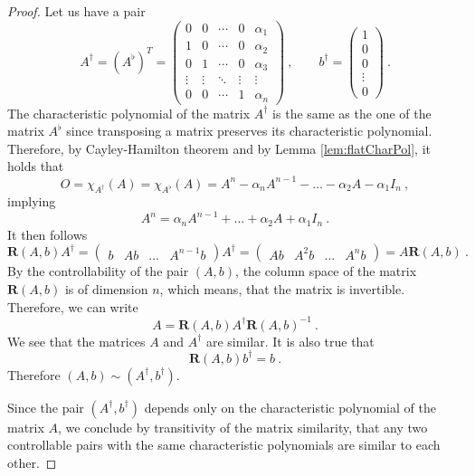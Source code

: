 \begin{proof}
    Let us have a pair
    $$A^\dagger=(A^\flat)^T=
    \begin{pmatrix}
        0 & 0 & \cdots & 0 & \alpha_1 \\
        1 & 0 & \cdots & 0 & \alpha_2 \\
        0 & 1 & \cdots & 0 & \alpha_3 \\
        \vdots & \vdots & \ddots & \vdots & \vdots \\
        0 & 0 & \cdots & 1 & \alpha_n
    \end{pmatrix}\ ,\qquad
    b^\dagger=
    \begin{pmatrix}
        1 \\ 0 \\ 0 \\ \vdots \\ 0
    \end{pmatrix}\ .$$
    The characteristic polynomial of the matrix $A^\dagger$ is the same as the one of the matrix $A^\flat$ since transposing a matrix preserves its characteristic polynomial. Therefore, by Cayley-Hamilton theorem and by Lemma \ref{lem:flatCharPol}, it holds that
    $$O=\chi_{A^\dagger}(A)=\chi_{A^\flat}(A)=A^n-\alpha_nA^{n-1}-\ldots-\alpha_2A-\alpha_1I_n\ ,$$
    implying
    $$A^n=\alpha_nA^{n-1}+\ldots+\alpha_2A+\alpha_1I_n\ .$$
    It then follows 
    $$\mathbf{R}(A,b)A^\dagger=
        \begin{pmatrix} 
            b & Ab & \ldots & A^{n-1}b
        \end{pmatrix}
    A^\dagger=
        \begin{pmatrix}
            Ab & A^2b & \ldots & A^nb
        \end{pmatrix}
    =A\mathbf{R}(A,b)\ .$$
    By the controllability of the pair $(A,b)$, the column space of the matrix $\mathbf{R}(A,b)$ is of dimension $n$, which means, that the matrix is invertible. Therefore, we can write 
    $$A=\mathbf{R}(A,b)A^\dagger\mathbf{R}(A,b)^{-1}\ .$$
    We see that the matrices $A$ and $A^\dagger$ are similar. It is also true that $$\mathbf{R}(A,b)b^\dagger=b\ .$$ Therefore $(A,b)\sim(A^\dagger,b^\dagger)$.

    Since the pair $(A^\dagger,b^\dagger)$ depends only on the characteristic polynomial of the matrix $A$, we conclude by transitivity of the matrix similarity, that any two controllable pairs with the same characteristic polynomials are similar to each other.
\end{proof}

